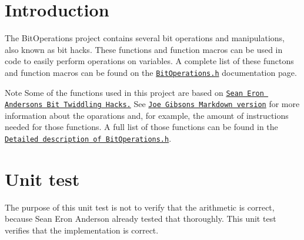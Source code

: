 \hypertarget{index_intro_sec}{}\section{Introduction}\label{index_intro_sec}
The Bit\+Operations project contains several bit operations and manipulations, also known as \textquotesingle{}bit hacks\textquotesingle{}. These functions and function macros can be used in code to easily perform operations on variables. A complete list of these functons and function macros can be found on the \href{BitOperations_8h.html}{\tt Bit\+Operations.\+h} documentation page.

\begin{DoxyNote}{Note}
Some of the functions used in this project are based on \href{https://graphics.stanford.edu/~seander/bithacks.html}{\tt Sean Eron Anderson\textquotesingle{}s Bit Twiddling Hacks.} See \href{https://github.com/gibsjose/BitHacks/blob/master/BitHacks.md}{\tt Joe Gibson\textquotesingle{}s Markdown version} for more information about the oparations and, for example, the amount of instructions needed for those functions. A full list of those functions can be found in the \href{BitOperations_8h.html#details}{\tt Detailed description of Bit\+Operations.\+h}.
\end{DoxyNote}
\hypertarget{index_unit_test}{}\section{Unit test}\label{index_unit_test}
The purpose of this unit test is not to verify that the arithmetic is correct, because Sean Eron Anderson already tested that thoroughly. This unit test verifies that the implementation is correct. 